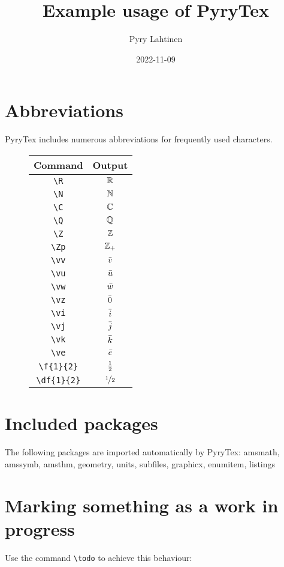 \documentclass[11pt,a4paper]{article}
\title{Example usage of PyryTex}
\author{Pyry Lahtinen}
\date{2022-11-09}
\begin{document}
\maketitle

\section{Abbreviations}
PyryTex includes numerous abbreviations for frequently used characters.

\begin{figure}[h]
    \centering\begin{tabular}{c|c}
        Command & Output \\
        \hline
        \verb!\R! & $\mathbb R$ \\
        \verb!\N! & $\mathbb N$ \\
        \verb!\C! & $\mathbb C$ \\
        \verb!\Q! & $\mathbb Q$ \\
        \verb!\Z! & $\mathbb Z$ \\
        \verb!\Zp! & $\mathbb Z_+$ \\
        \verb!\vv! & $\bar v$ \\
        \verb!\vu! & $\bar u$ \\
        \verb!\vw! & $\bar w$ \\
        \verb!\vz! & $\bar 0$ \\
        \verb!\vi! & $\bar i$ \\
        \verb!\vj! & $\bar j$ \\
        \verb!\vk! & $\bar k$ \\
        \verb!\ve! & $\bar e$ \\
        \verb!\f{1}{2}! & $\frac{1}{2}$ \\
        \verb!\df{1}{2}! & $\nicefrac{1}{2}$
    \end{tabular}
\end{figure}

\section{Included packages}
The following packages are imported automatically by PyryTex:
amsmath, amssymb, amsthm, geometry, units, subfiles, graphicx, enumitem, listings

\section{Marking something as a work in progress}
Use the command \verb!\todo! to achieve this behaviour:
\end{document}
